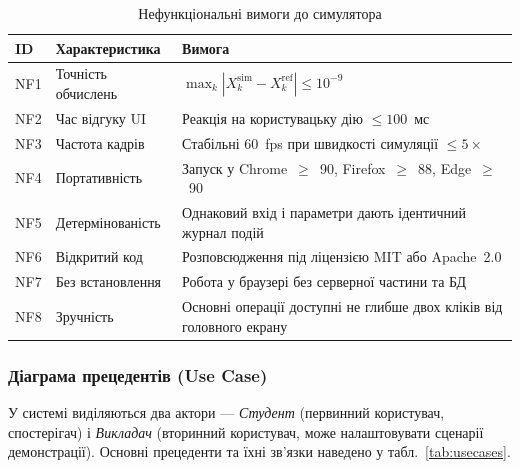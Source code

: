 \begin{table}[H]
  \caption{Нефункціональні вимоги до симулятора}
  \label{tab:nonfunc_req}
  \centering
  \small
  \begin{tabular}{p{1.4cm}p{3.8cm}p{8.2cm}}
    \toprule
    ID & Характеристика & Вимога \\
    \midrule
    NF1 & Точність обчислень & $\max_k |X_k^{\mathrm{sim}} - X_k^{\mathrm{ref}}| \le 10^{-9}$ \\
    NF2 & Час відгуку UI & Реакція на користувацьку дію $\le 100$~мс \\
    NF3 & Частота кадрів & Стабільні 60~fps при швидкості симуляції $\le 5\times$ \\
    NF4 & Портативність & Запуск у Chrome~$\ge$~90, Firefox~$\ge$~88, Edge~$\ge$~90 \\
    NF5 & Детермінованість & Однаковий вхід і параметри дають ідентичний журнал подій \\
    NF6 & Відкритий код & Розповсюдження під ліцензією MIT або Apache~2.0 \\
    NF7 & Без встановлення & Робота у браузері без серверної частини та БД \\
    NF8 & Зручність & Основні операції доступні не глибше двох кліків від головного екрану \\
    \bottomrule
  \end{tabular}
\end{table}

\subsubsection*{Діаграма прецедентів (Use Case)}

У системі виділяються два актори --- \emph{Студент} (первинний
користувач, спостерігач) і \emph{Викладач} (вторинний користувач,
може налаштовувати сценарії демонстрації). Основні прецеденти та
їхні зв'язки наведено у табл.~\ref{tab:usecases}.

